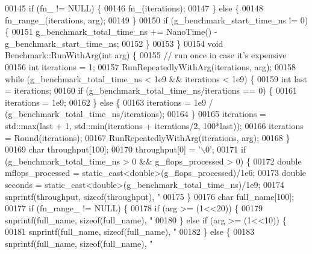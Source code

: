 \begin{DoxyCode}
{{{00145   \textcolor{keywordflow}{if} (fn\_ != NULL) \{
00146     fn\_(iterations);
00147   \} \textcolor{keywordflow}{else} \{
00148     fn\_range\_(iterations, arg);
00149   \}
00150   \textcolor{keywordflow}{if} (g\_benchmark\_start\_time\_ns != 0) \{
00151     g\_benchmark\_total\_time\_ns += NanoTime() - g\_benchmark\_start\_time\_ns;
00152   \}
00153 \}
00154 \textcolor{keywordtype}{void} Benchmark::RunWithArg(\textcolor{keywordtype}{int} arg) \{
00155   \textcolor{comment}{// run once in case it's expensive}
00156   \textcolor{keywordtype}{int} iterations = 1;
00157   RunRepeatedlyWithArg(iterations, arg);
00158   \textcolor{keywordflow}{while} (g\_benchmark\_total\_time\_ns < 1e9 && iterations < 1e9) \{
00159     \textcolor{keywordtype}{int} last = iterations;
00160     \textcolor{keywordflow}{if} (g\_benchmark\_total\_time\_ns/iterations == 0) \{
00161       iterations = 1e9;
00162     \} \textcolor{keywordflow}{else} \{
00163       iterations = 1e9 / (g\_benchmark\_total\_time\_ns/iterations);
00164     \}
00165     iterations = std::max(last + 1, std::min(iterations + iterations/2, 100*last));
00166     iterations = Round(iterations);
00167     RunRepeatedlyWithArg(iterations, arg);
00168   \}
00169   \textcolor{keywordtype}{char} throughput[100];
00170   throughput[0] = \textcolor{charliteral}{'\(\backslash\)0'};
00171   \textcolor{keywordflow}{if} (g\_benchmark\_total\_time\_ns > 0 && g\_flops\_processed > 0) \{
00172     \textcolor{keywordtype}{double} mflops\_processed = \textcolor{keyword}{static\_cast<}\textcolor{keywordtype}{double}\textcolor{keyword}{>}(g\_flops\_processed)/1e6;
00173     \textcolor{keywordtype}{double} seconds = \textcolor{keyword}{static\_cast<}\textcolor{keywordtype}{double}\textcolor{keyword}{>}(g\_benchmark\_total\_time\_ns)/1e9;
00174     snprintf(throughput, \textcolor{keyword}{sizeof}(throughput), \textcolor{stringliteral}{" %
00175   \}
00176   \textcolor{keywordtype}{char} full\_name[100];
00177   \textcolor{keywordflow}{if} (fn\_range\_ != NULL) \{
00178     \textcolor{keywordflow}{if} (arg >= (1<<20)) \{
00179       snprintf(full\_name, \textcolor{keyword}{sizeof}(full\_name), \textcolor{stringliteral}{"%
00180     \} \textcolor{keywordflow}{else} \textcolor{keywordflow}{if} (arg >= (1<<10)) \{
00181       snprintf(full\_name, \textcolor{keyword}{sizeof}(full\_name), \textcolor{stringliteral}{"%
00182     \} \textcolor{keywordflow}{else} \{
00183       snprintf(full\_name, \textcolor{keyword}{sizeof}(full\_name), \textcolor{stringliteral}{"%
}}}}}}}
\end{DoxyCode}
